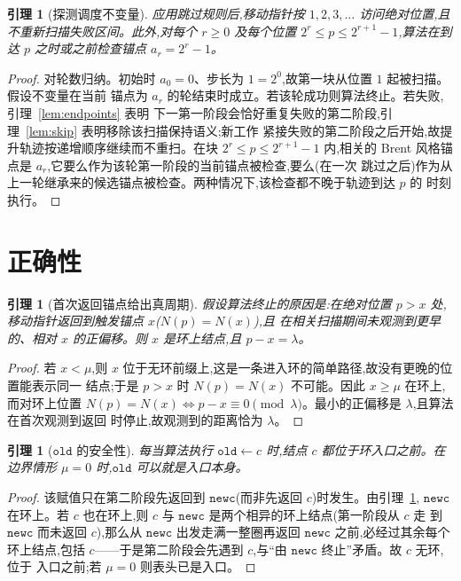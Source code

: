 \documentclass[11pt]{ctexart}
\newtheorem{lemma}[theorem]{引理}
\newcommand{\oldc}{\texttt{old}}
\newcommand{\newc}{\texttt{newc}}
\begin{document}
\begin{lemma}[探测调度不变量]
\label{lem:schedule}
应用跳过规则后,移动指针按 $1,2,3,\dots$ 访问绝对位置,且不重新扫描失败区间。此外,对每个
$r\ge 0$ 及每个位置 $2^r\le p\le 2^{r+1}-1$,算法在到达 $p$ 之时或之前检查锚点
$a_r=2^r-1$。
\end{lemma}

\begin{proof}
对轮数归纳。初始时 $a_0=0$、步长为 $1=2^0$,故第一块从位置 $1$ 起被扫描。假设不变量在当前
锚点为 $a_r$ 的轮结束时成立。若该轮成功则算法终止。若失败,引理~\ref{lem:endpoints} 表明
下一第一阶段会恰好重复失败的第二阶段,引理~\ref{lem:skip} 表明移除该扫描保持语义;新工作
紧接失败的第二阶段之后开始,故提升轨迹按递增顺序继续而不重扫。在块 $2^r\le p\le 2^{r+1}-1$
内,相关的 Brent 风格锚点是 $a_r$,它要么作为该轮第一阶段的当前锚点被检查,要么(在一次
跳过之后)作为从上一轮继承来的候选锚点被检查。两种情况下,该检查都不晚于轨迹到达 $p$ 的
时刻执行。
\end{proof}

\section{正确性}
\label{sec:correctness}

\begin{lemma}[首次返回锚点给出真周期]
\label{lem:first-return}
假设算法终止的原因是:在绝对位置 $p>x$ 处,移动指针返回到触发锚点 $x$($N(p)=N(x)$),且
在相关扫描期间未观测到更早的、相对 $x$ 的正偏移。则 $x$ 是环上结点,且 $p-x=\lambda$。
\end{lemma}

\begin{proof}
若 $x<\mu$,则 $x$ 位于无环前缀上,这是一条进入环的简单路径,故没有更晚的位置能表示同一
结点;于是 $p>x$ 时 $N(p)=N(x)$ 不可能。因此 $x\ge\mu$ 在环上,而对环上位置
$N(p)=N(x)\iff p-x\equiv 0\pmod\lambda$。最小的正偏移是 $\lambda$,且算法在首次观测到返回
时停止,故观测到的距离恰为 $\lambda$。
\end{proof}

\begin{lemma}[$\oldc$ 的安全性]
\label{lem:oldc}
每当算法执行 $\oldc\gets c$ 时,结点 $c$ 都位于环入口之前。在边界情形 $\mu=0$ 时,$\oldc$
可以就是入口本身。
\end{lemma}

\begin{proof}
该赋值只在第二阶段先返回到 $\newc$(而非先返回 $c$)时发生。由引理~\ref{lem:first-return},
$\newc$ 在环上。若 $c$ 也在环上,则 $c$ 与 $\newc$ 是两个相异的环上结点(第一阶段从 $c$ 走
到 $\newc$ 而未返回 $c$),那么从 $\newc$ 出发走满一整圈再返回 $\newc$ 之前,必经过其余每个
环上结点,包括 $c$——于是第二阶段会先遇到 $c$,与``由 $\newc$ 终止''矛盾。故 $c$ 无环,位于
入口之前;若 $\mu=0$ 则表头已是入口。
\end{proof}
\end{document}
